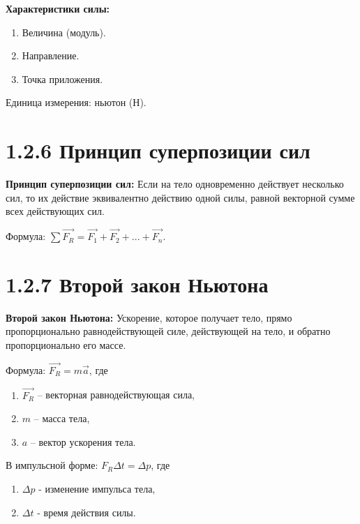 \documentclass[a4paper,12pt]{article}
\begin{document}
\textbf{Характеристики силы:}
\begin{enumerate} [itemsep=0pt, topsep=0pt, parsep=3pt]
    \item Величина (модуль).
    \item Направление.
    \item Точка приложения.
\end{enumerate}
Единица измерения: ньютон (Н).

\section*{1.2.6 Принцип суперпозиции сил}
\vspace{-9pt}
\textbf{Принцип суперпозиции сил:} Если на тело одновременно действует несколько сил, то их действие эквивалентно действию одной силы, равной векторной сумме всех действующих сил.
\vspace{-3pt}

Формула: $\sum{\vec{F_R}} =\vec{F_1} + \vec{F_2} + ... + \vec{F_n}$.

\section*{1.2.7 Второй закон Ньютона}
\vspace{-9pt}
\textbf{Второй закон Ньютона:} Ускорение, которое получает тело, прямо пропорционально равнодействующей силе, действующей на тело, и обратно пропорционально его массе.
\vspace{-3pt}

Формула: $\vec{F_R} = m\vec{a}$, где
\begin{enumerate} [itemsep=0pt, topsep=0pt, parsep=3pt]
    \item $\vec{F_R}$ – векторная равнодействующая сила,
    \item $m$ – масса тела,
    \item $a$ – вектор ускорения тела.
\end{enumerate}

В импульсной форме: $F_R\Delta{t} = \Delta{p}$, где
\begin{enumerate} [itemsep=0pt, topsep=0pt, parsep=3pt]
    \item $\Delta{p}$ - изменение импульса тела,
    \item $\Delta{t}$ - время действия силы.
\end{enumerate}

\newpage
\end{document}
